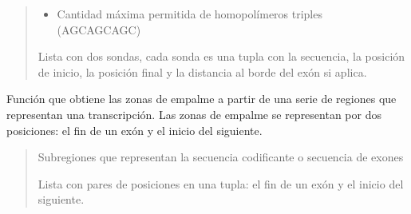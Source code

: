 \documentclass[letterpaper,10pt,spanish]{sphinxmanual}
\begin{document}
\begin{fulllineitems}
\begin{quote}
\begin{description}
\begin{itemize}
\item {} 
\sphinxAtStartPar
{} \textendash{} Cantidad máxima permitida de homopolímeros triples (AGCAGCAGC)

\end{itemize}

\sphinxAtStartPar
Lista con dos sondas, cada sonda es una tupla con la secuencia, la posición de inicio, la posición final y la distancia al borde del exón si aplica.

\end{description}\end{quote}

\end{fulllineitems}


\begin{fulllineitems}
\label{\detokenize{diseno:diseno.get_splicing_pairs}}
\pysigstartsignatures
{}
\pysigstopsignatures
\sphinxAtStartPar
Función que obtiene las zonas de empalme a partir de una serie de regiones que representan una transcripción.
Las zonas de empalme se representan por dos posiciones: el fin de un exón y el inicio del siguiente.
\begin{quote}\begin{description}
\sphinxAtStartPar
{} \textendash{} Subregiones que representan la secuencia codificante o secuencia de exones

\sphinxAtStartPar
Lista con pares de posiciones en una tupla: el fin de un exón y el inicio del siguiente.

\end{description}\end{quote}

\end{fulllineitems}

\end{document}

